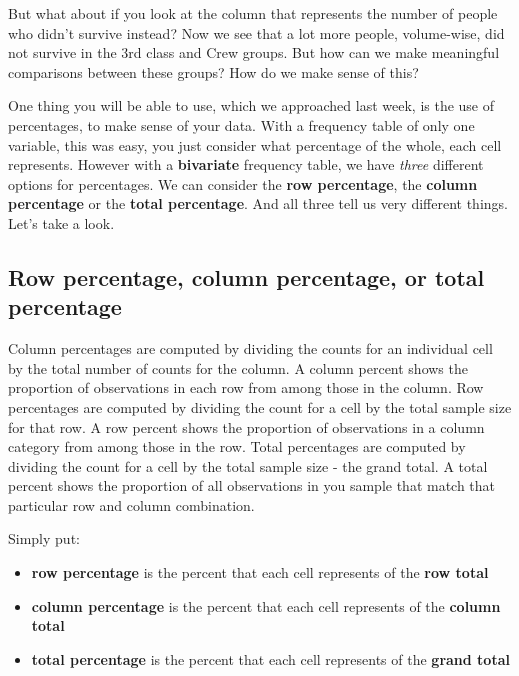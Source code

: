 \documentclass[]{book}
\providecommand{\tightlist}{%
  \setlength{\itemsep}{0pt}\setlength{\parskip}{0pt}}
\theoremstyle{definition}
\theoremstyle{definition}
\theoremstyle{definition}
\theoremstyle{remark}
\begin{document}
But what about if you look at the column that represents the number of
people who didn't survive instead? Now we see that a lot more people,
volume-wise, did not survive in the 3rd class and Crew groups. But how
can we make meaningful comparisons between these groups? How do we make
sense of this?

One thing you will be able to use, which we approached last week, is the
use of percentages, to make sense of your data. With a frequency table
of only one variable, this was easy, you just consider what percentage
of the whole, each cell represents. However with a \textbf{bivariate}
frequency table, we have \emph{three} different options for percentages.
We can consider the \textbf{row percentage}, the \textbf{column
percentage} or the \textbf{total percentage}. And all three tell us very
different things. Let's take a look.

\hypertarget{row-percentage-column-percentage-or-total-percentage}{%
\subsection{Row percentage, column percentage, or total
percentage}\label{row-percentage-column-percentage-or-total-percentage}}

Column percentages are computed by dividing the counts for an individual
cell by the total number of counts for the column. A column percent
shows the proportion of observations in each row from among those in the
column. Row percentages are computed by dividing the count for a cell by
the total sample size for that row. A row percent shows the proportion
of observations in a column category from among those in the row. Total
percentages are computed by dividing the count for a cell by the total
sample size - the grand total. A total percent shows the proportion of
all observations in you sample that match that particular row and column
combination.

Simply put:

\begin{itemize}
\tightlist
\item
  \textbf{row percentage} is the percent that each cell represents of
  the \textbf{row total}
\item
  \textbf{column percentage} is the percent that each cell represents of
  the \textbf{column total}
\item
  \textbf{total percentage} is the percent that each cell represents of
  the \textbf{grand total}
\end{itemize}
\end{document}
